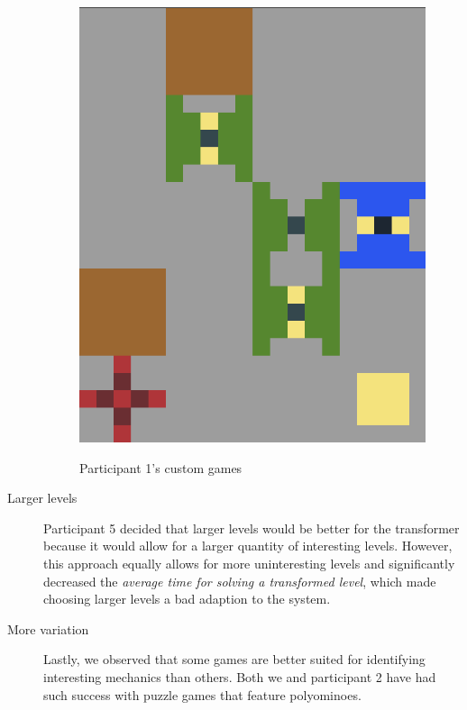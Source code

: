 \begin{description}
\begin{figure}
\begin{minipage}[t]{0.3\textwidth}
\includegraphics[width=\textwidth]{figures/part1allgreentoblueonyellow.png} \\
\end{minipage}
\caption{Participant 1's custom games \label{fig:part1smalllevelgames}}
\end{figure}

    \item[Larger levels] Participant 5 decided that larger levels would be better for the transformer because it would allow for a larger quantity of interesting levels. However, this approach equally allows for more uninteresting levels and significantly decreased the \textit{average time for solving a transformed level}, which made choosing larger levels a bad adaption to the system.
    
    \item[More variation] Lastly, we observed that some games are better suited for identifying interesting mechanics than others. Both we and participant 2 have had such success with puzzle games that feature polyominoes.


\end{description}

